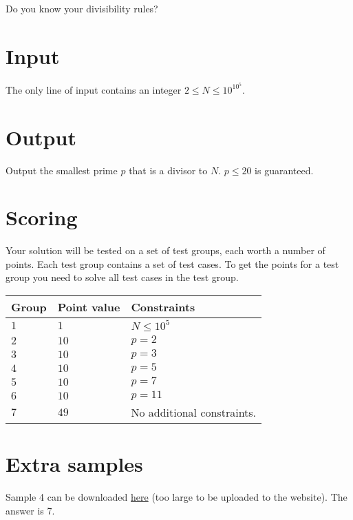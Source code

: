 \noindent
Do you know your divisibility rules?


\section*{Input}
\noindent
The only line of input contains an integer $2 \leq N \leq 10^{10^5}$. 

\section*{Output}
\noindent
Output the smallest prime $p$ that is a divisor to $N$. $p \leq 20$ is guaranteed.


\section*{Scoring}
Your solution will be tested on a set of test groups, each worth a number of points. 
Each test group contains a set of test cases. 
To get the points for a test group you need to solve all test cases in the test group.

\noindent
\begin{tabular}{| l | l | p{12cm} |}
  \hline
  \textbf{Group} & \textbf{Point value} & \textbf{Constraints} \\ \hline
  $1$    & $1$          & $N \leq 10^5$  \\ \hline
  $2$    & $10$         & $p = 2$  \\ \hline
  $3$    & $10$         & $p = 3$  \\ \hline
  $4$    & $10$         & $p = 5$  \\ \hline
  $5$    & $10$         & $p = 7$  \\ \hline
  $6$    & $10$         & $p = 11$  \\ \hline
  $7$    & $49$         & No additional constraints. \\ \hline
\end{tabular}

\section*{Extra samples}
Sample 4 can be downloaded \href{https://github.com/hairez/random-files/blob/main/cool-numbers-003.txt}{here} (too large to be uploaded to the website).
The answer is 7.

